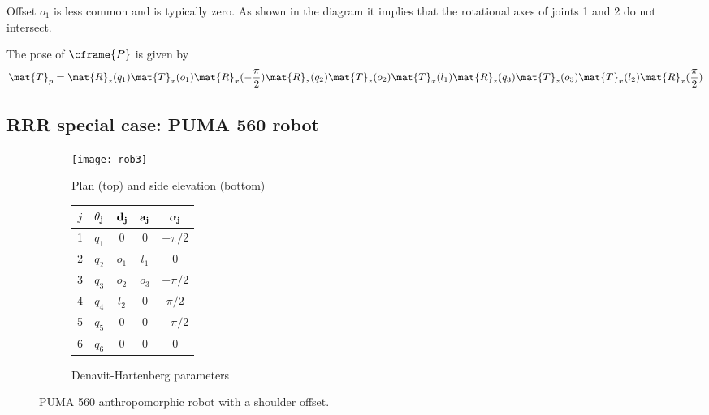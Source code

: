 \documentclass[11pt]{article}
\numberwithin{equation}{section}
\begin{document}
Offset $o_1$ is less common and is typically zero.  As shown in the diagram it implies that the rotational axes of joints 1 and 2 do not 
intersect.

The pose of $\cframe{P}$ is given by
\[
\mat{T}_p = \mat{R}_z(q_1) \mat{T}_x(o_1) \mat{R}_x(-\frac{\pi}{2}) \mat{R}_z(q_2)  \mat{T}_z(o_2) \mat{T}_x(l_1) \mat{R}_z(q_3) \mat{T}_z(o_3) \mat{T}_x(l_2) \mat{R}_x(\frac{\pi}{2})
\]

\pagebreak


\subsection{RRR special case: PUMA 560 robot }\label{sec:puma560}

	\begin{figure}[h]
	\centering
	\begin{subfigure}[b]{0.6\textwidth}
		\centering
		\texttt{[image: rob3]}
		\caption{Plan (top) and side elevation (bottom)}
	\label{fig:rob3} 
	\end{subfigure}
	\begin{subfigure}[b]{0.3\textwidth}
		\begin{tabular}{|c|c|c|c|c|} \hline
			$j$ & $\bf \theta_j$ & $\bf d_j$ & $\bf a_j$ & $\bf \alpha_j$ \\ \hline
			\rowcolor{SkyBlue}1 &  $q_1$ & \cellcolor{White} 0 &  0 & $+\pi/2$ \\
			\rowcolor{SkyBlue}2 &  $q_2$ & $o_1$ & $l_1$& 0 \\
			\rowcolor{SkyBlue}3 & $q_3$ & $o_2$ &$o_3$  & $-\pi/2$ \\
			\rowcolor{Peach}4 &  $q_4$ & \cellcolor{SkyBlue} $l_2$  & 0 & $\pi/2$ \\
			\rowcolor{Peach}5 &$q_5$ & 0 & 0 & $-\pi/2$ \\
			\cellcolor{Peach} 6 & \cellcolor{Peach} $q_6$ &0  &0  & 0 \\ \hline
		\end{tabular}
		\caption{Denavit-Hartenberg parameters\cite{Paul86a}}
		\label{fig:dh3}
	\end{subfigure}
	\caption{PUMA 560 anthropomorphic robot with a shoulder offset.}
	\end{figure}
\end{document}
